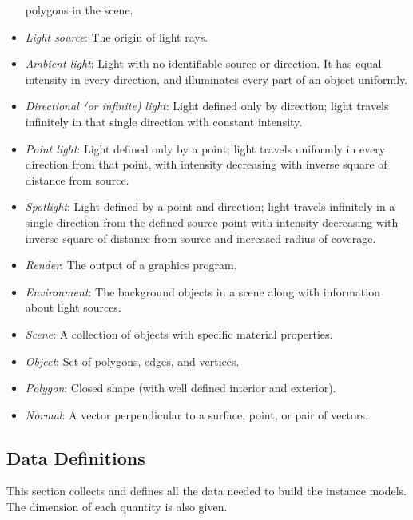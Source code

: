 \documentclass[12pt]{article}
\begin{document}
\begin{itemize}
polygons in the scene.
\item[\label{}] \textit{Light source}: The origin of light rays.
\item[\label{}] \textit{Ambient light}: Light with no identifiable source or 
direction. It has equal intensity in every direction, and illuminates every 
part of an object uniformly.
\item[\label{}] \textit{Directional (or infinite) light}: Light defined only by 
direction; light travels infinitely in that single direction with constant 
intensity. 
\item[\label{}] \textit{Point light}: Light defined only by a point; light 
travels uniformly in every direction from that point, with intensity decreasing 
with inverse square of distance from source. 
\item[\label{}] \textit{Spotlight}: Light defined by a point and direction; 
light travels infinitely in a single direction from the defined source point 
with intensity decreasing with inverse square of distance from source and 
increased radius of coverage.
\item[\label{}] \textit{Render}: The output of a graphics program.
\item[\label{}] \textit{Environment}: The background objects in a scene along 
with information about light sources.
\item[\label{}] \textit{Scene}: A collection of objects with specific material 
properties. 
\item[\label{}] \textit{Object}: Set of polygons, edges, and vertices. 
\item[\label{}] \textit{Polygon}: Closed shape (with well defined interior and 
exterior).
\item[\label{}] \textit{Normal}: A vector perpendicular to a surface, point, or 
pair of 
vectors.


\end{itemize}

\subsection{Data Definitions} \label{sec_datadef}
This section collects and defines all the data needed to build the instance
models. The dimension of each quantity is also given.

~\newline
\end{document}
